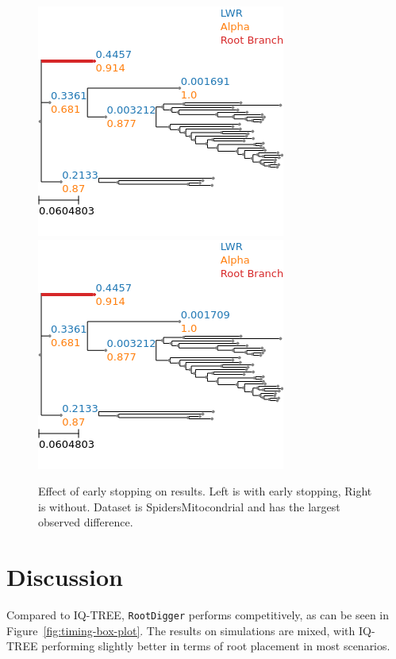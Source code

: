 \documentclass{article}
\newcommand{\RootDiggertt}{\texttt{RootDigger}}
\begin{document}
\begin{figure}[H]
  \begin{center}
    \includegraphics[width=.4\linewidth]{figs/early_stop_tests/es_test_mito_no_outgroup.png}
    \includegraphics[width=.4\linewidth]{figs/early_stop_tests/es_test_mito_no_outgroup_noes.png}
    \caption{Effect of early stopping on results. Left is with early stopping,
    Right is without. Dataset is SpidersMitocondrial and has the largest
  observed difference.}
    \label{fig:es_mito}
  \end{center}
\end{figure}

\section{Discussion}

Compared to IQ-TREE, \RootDiggertt{} performs competitively, as can be seen in
Figure~\ref{fig:timing-box-plot}. The results on simulations are mixed, with
IQ-TREE performing slightly better in terms of root placement in most scenarios.
\end{document}
